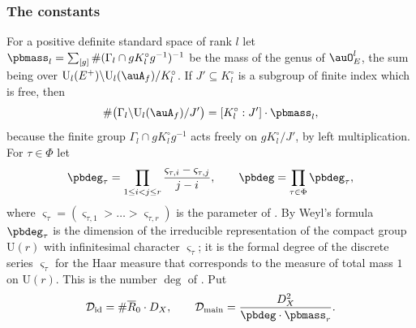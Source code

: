 \documentclass[10pt]{amsart}
\theoremstyle{definition}
\theoremstyle{remark}
\providecommand{\auDX}{D_X}
\providecommand{\auPl}{\Phi}
\providecommand{\auU}{\mathrm U}
\providecommand{\pbDid}{\mathcal D_{\mathrm{id}}}
\providecommand{\pbDmain}{\mathcal D_{\mathrm{main}}}
\providecommand{\pbR}{\overline R_0}
\begin{document}
\subsubsection*{The constants}
For a positive definite standard space of rank $l$ let $\pbmass_l=\sum_{[g]}\#(\Gamma_l\cap
gK^\circ_lg^{-1})^{-1}$ be the mass of the genus of $\auO_E^l$, the sum being over $\auU_l(E^+)
\backslash\auU_l(\auA_f)/K_l^\circ$. If $J'\subseteq K_l^\circ$ is a subgroup of finite index which is free, then
\begin{equation}\label{pb:eq-classes}
\#\bigl(\Gamma_l\backslash\auU_l(\auA_f)/J'\bigr)=[K_l^\circ:J']\cdot\pbmass_l ,
\end{equation}
because the finite group $\Gamma_l\cap gK_l^\circ g^{-1}$ acts freely on $gK_l^\circ/J'$, by left
multiplication. For $\tau\in\auPl$ let
\[
\pbdeg_\tau=\prod_{1\le i<j\le r}\frac{\varsigma_{\tau,i}-\varsigma_{\tau,j}}{j-i},\qquad
\pbdeg=\prod_{\tau\in\auPl}\pbdeg_\tau ,
\]
where $\varsigma_\tau=(\varsigma_{\tau,1}>\dots>\varsigma_{\tau,r})$ is the parameter of
{\cite[\S14.3]{P46}}. By Weyl's formula $\pbdeg_\tau$ is the dimension of the irreducible
representation of the compact group $\auU(r)$ with infinitesimal character $\varsigma_\tau$; it is
the formal degree of the discrete series $\varsigma_\tau$ for the Haar measure that corresponds
to the measure of total mass $1$ on $\auU(r)$. This is the number $\deg$ of
{\cite[Proposition~14.32]{P46}}. Put
\begin{equation}\label{pb:eq-D}
\pbDid=\#\pbR\cdot\auDX,\qquad\pbDmain=\frac{\auDX^2}{\pbdeg\cdot\pbmass_r}.
\end{equation}
\end{document}
